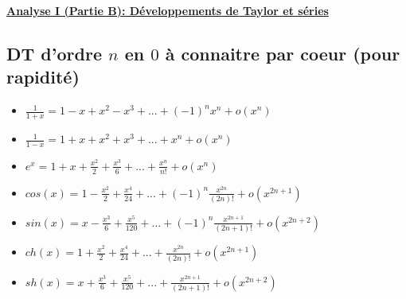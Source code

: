 \documentclass[a4paper,11pt]{report}
\begin{document}
\renewcommand{\labelitemi}{$\cdot$}
\begin{Large}\begin{center} 
   \underline{\textbf{Analyse I (Partie B): Développements de Taylor et séries}} 
\end{center}\end{Large}

\subsection{DT d'ordre $n$ en $0$ à connaitre par coeur (pour rapidité)}
\begin{itemize}
	\item $\frac{1}{1+x}=1-x+x^2-x^3+...+(-1)^n x^n+o(x^n)$\\
	\item $\frac{1}{1-x}=1+x+x^2+x^3+...+x^n+o(x^n)$\\
	\item $e^x=1+x+\frac{x^2}{2}+\frac{x^3}{6}+...+\frac{x^n}{n!}+o(x^n)$\\
	\item $cos(x)=1-\frac{x^2}{2}+\frac{x^4}{24}+...+(-1)^n\frac{x^{2n}}{(2n)!}+o(x^{2n+1})$\\
	\item $sin(x)=x-\frac{x^3}{6}+\frac{x^5}{120}+...+(-1)^n\frac{x^{2n+1}}{(2n+1)!}+o(x^{2n+2})$\\
	\item $ch(x)=1+\frac{x^2}{2}+\frac{x^4}{24}+...+\frac{x^{2n}}{(2n)!}+o(x^{2n+1})$\\
	\item $sh(x)=x+\frac{x^3}{6}+\frac{x^5}{120}+...+\frac{x^{2n+1}}{(2n+1)!}+o(x^{2n+2})$\\
\end{itemize}
\end{document}
